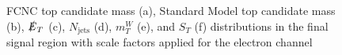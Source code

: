 \begin{figure}[]
\hfil  %
\caption{FCNC top candidate mass (a), Standard Model top candidate mass (b), $\slashed{E}_T$ (c), $N_\text{jets}$ (d),  $m_T^W$ (e), and $S_T$ (f) distributions in the final signal region with scale factors applied for the electron channel}
\label{fig:SRej2}
\end{figure}


